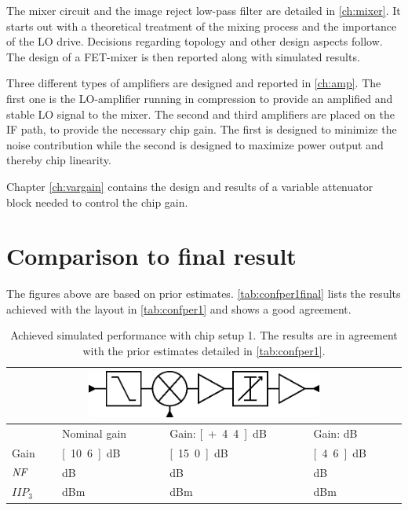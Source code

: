 		The mixer circuit and the image reject low-pass filter are detailed in \autoref{ch:mixer}. It starts out with a theoretical treatment of the mixing process and the importance of the LO drive. Decisions regarding topology and other design aspects follow. The design of a FET-mixer is then reported along with simulated results.

		Three different types of amplifiers are designed and reported in \autoref{ch:amp}. The first one is the LO-amplifier running in compression to provide an amplified and stable LO signal to the mixer. The second and third amplifiers are placed on the IF path, to provide the necessary chip gain. The first is designed to minimize the noise contribution while the second is designed to maximize power output and thereby chip linearity.

		Chapter \ref{ch:vargain} contains the design and results of a variable attenuator block needed to control the chip gain.

	\section{Comparison to final result}
		The figures above are based on prior estimates. \autoref{tab:confper1final} lists the results achieved with the layout in \autoref{tab:confper1} and shows a good agreement.

		\begin{table}[hpt!]
			\caption[Achieved simulated performance with chip setup 1.]{Achieved simulated performance with chip setup 1. The results are in agreement with the prior estimates detailed in \autoref{tab:confper1}.}
			\label{tab:confper1final}
			\centering
			\begin{tabular}{ l l l l }
				\multicolumn{4}{c}{\includegraphics[width=0.6\textwidth]{fig/system/sys1}} \\\toprule
				& Nominal gain & Gain: \unit[+4.4]{dB} & Gain: \unit[-6]{dB} \\\midrule
				Gain & \unit[10.6]{dB} & \unit[15.0]{dB} & \unit[4.6]{dB} \\
				$\emph{NF}$ & \unit[11]{dB} & \unit[10]{dB} & \unit[13]{dB} \\
				$IIP_3$ & \unit[20]{dBm} & \unit[17]{dBm} & \unit[21]{dBm}  \\\bottomrule
			\end{tabular}
		\end{table}
